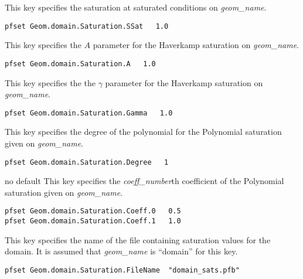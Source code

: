 {This key specifies the saturation at saturated conditions on {\em geom\_name}.
}
\begin{display}\begin{verbatim}
pfset Geom.domain.Saturation.SSat   1.0
\end{verbatim}\end{display}

{This key specifies the $A$ parameter for the Haverkamp saturation
on {\em geom\_name}.
}
\begin{display}\begin{verbatim}
pfset Geom.domain.Saturation.A   1.0
\end{verbatim}\end{display}

{This key specifies the the $\gamma$ parameter for the Haverkamp saturation
on {\em geom\_name}.
}
\begin{display}\begin{verbatim}
pfset Geom.domain.Saturation.Gamma   1.0
\end{verbatim}\end{display}

{This key specifies the degree of the polynomial for the Polynomial
saturation given on {\em geom\_name}.
}
\begin{display}\begin{verbatim}
pfset Geom.domain.Saturation.Degree   1
\end{verbatim}\end{display}

{no default}
{This key specifies the {\em coeff\_number}th coefficient of the Polynomial
saturation given on {\em geom\_name}.
}
\begin{display}\begin{verbatim}
pfset Geom.domain.Saturation.Coeff.0   0.5
pfset Geom.domain.Saturation.Coeff.1   1.0
\end{verbatim}\end{display}

{This key specifies the name of the file containing saturation values for the
domain.  It is assumed that {\em geom\_name} is ``domain'' for this key.}
\begin{display}\begin{verbatim}
pfset Geom.domain.Saturation.FileName  "domain_sats.pfb"
\end{verbatim}\end{display}

